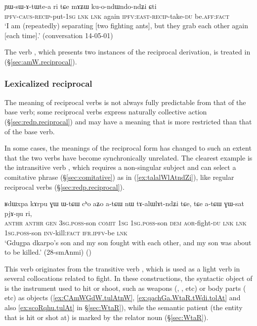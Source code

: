 \begin{exe}
\ex \label{ex:YWsAtWtea}
\gll ɲɯ-sɯ-ɤ-tɯ\redp{}te-a ri tɕe mɤʑɯ ku-o-ndɯ\redp{}ndo-ndʑi ɕti \\
\textsc{ipfv}-\textsc{caus}-\textsc{recip}-put-\textsc{1sg} \textsc{lnk} \textsc{lnk} again \textsc{ipfv}:\textsc{east}-\textsc{recip}-take-\textsc{du} be.\textsc{aff}:\textsc{fact} \\
\glt `I am (repeatedly) separating [two fighting ants], but they grab each other again [each time].' (conversation 14-05-01)
\end{exe}

The verb , which presents two instances of the reciprocal derivation, is treated in (§\ref{sec:amW.reciprocal}).
 
\subsubsection{Lexicalized reciprocal} \label{sec:redp.lexicalized}
The meaning of reciprocal verbs is not always fully predictable from that of the base verb; some reciprocal verbs express naturally collective action (§\ref{sec:redp.reciprocal}) and may have a meaning that is more restricted than that of the base verb.

In some cases, the meanings of the reciprocal form has changed to such an extent that the two verbs have become synchronically unrelated. The clearest example is the intransitive verb , which requires a non-singular subject and can select a comitative phrase (§\ref{sec:comitative}) as in (\ref{ex:talalWlAtndZi}), like regular reciprocal verbs (§\ref{sec:redp.reciprocal}). 

\begin{exe}
\ex \label{ex:talalWlAtndZi}
\gll ʁdɯxpa kɤrpu ɣɯ ɯ-tɕɯ cʰo aʑo a-tɕɯ nɯ tɤ-alɯlɤt-ndʑi tɕe, tɕe a-tɕɯ ɣɯ-sat pjɤ-ŋu ri, \\
\textsc{anthr}  \textsc{anthr} \textsc{gen} \textsc{3sg}.\textsc{poss}-son \textsc{comit} \textsc{1sg} \textsc{1sg}.\textsc{poss}-son \textsc{dem} \textsc{aor}-fight-\textsc{du}  \textsc{lnk} \textsc{lnk} \textsc{1sg}.\textsc{poss}-son \textsc{inv}-kill:\textsc{fact} \textsc{ifr}.\textsc{ipfv}-be \textsc{lnk} \\
\glt `Gdugpa dkarpo's son and my son fought with each other, and my son was about to be killed.' (28-smAnmi)
()
\end{exe}

This verb originates from the transitive verb , which is used as a light verb in several collocations related to fight. In these constructions, the syntactic object of  is the instrument used to hit or shoot, such as weapons (, ,  etc) or body parts ( etc) as objects (\ref{ex:CAmWGdW.tulAtnW}, \ref{ex:qachGa.WtaR.tWdi.tolAt} and also \ref{ex:scoRqhu.tulAt} in §\ref{sec:WtaR}), while the semantic patient (the entity that is hit or shot at) is marked by the relator noun  (§\ref{sec:WtaR}).

